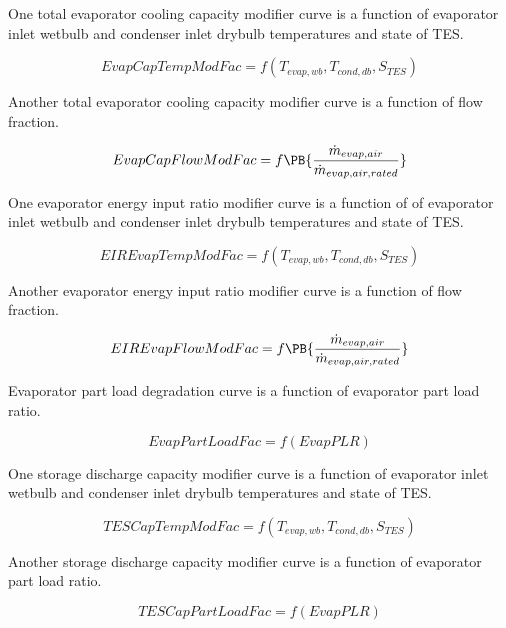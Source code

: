 One total evaporator cooling capacity modifier curve is a function of evaporator inlet wetbulb and condenser inlet drybulb temperatures and state of TES.

\begin{equation}
EvapCapTempModFac = f\left( {{T_{evap,wb}},{T_{cond,db}},{S_{TES}}} \right)
\end{equation}

Another total evaporator cooling capacity modifier curve is a function of flow fraction.

\begin{equation}
EvapCapFlowModFac = f\PB{\frac{\dot{m}_{evap,air}}{\dot{m}_{evap,air,rated}}}
\end{equation}

One evaporator energy input ratio modifier curve is a function of of evaporator inlet wetbulb and condenser inlet drybulb temperatures and state of TES.

\begin{equation}
EIREvapTempModFac = f\left( {{T_{evap,wb}},{T_{cond,db}},{S_{TES}}} \right)
\end{equation}

Another evaporator energy input ratio modifier curve is a function of flow fraction.

\begin{equation}
EIREvapFlowModFac = f\PB{\frac{\dot{m}_{evap,air}}{\dot{m}_{evap,air,rated}}}
\end{equation}

Evaporator part load degradation curve is a function of evaporator part load ratio.

\begin{equation}
EvapPartLoadFac = f\left( {EvapPLR} \right)
\end{equation}

One storage discharge capacity modifier curve is a function of evaporator inlet wetbulb and condenser inlet drybulb temperatures and state of TES.

\begin{equation}
TESCapTempModFac = f\left( {{T_{evap,wb}},{T_{cond,db}},{S_{TES}}} \right)
\end{equation}

Another storage discharge capacity modifier curve is a function of evaporator part load ratio.

\begin{equation}
TESCapPartLoadFac = f\left( {EvapPLR} \right)
\end{equation}

